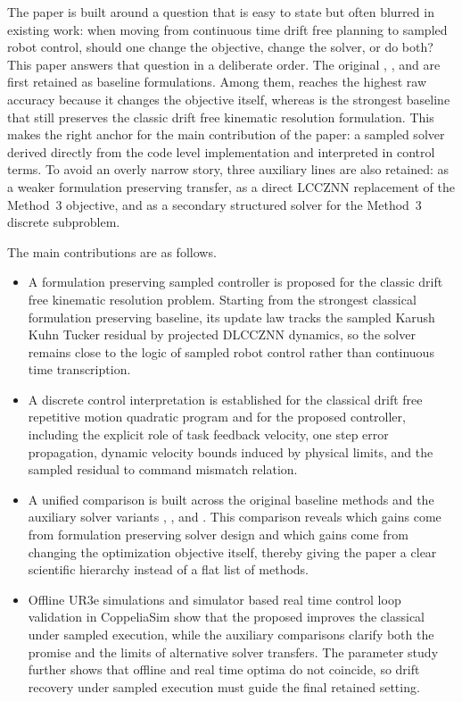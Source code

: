 The paper is built around a question that is easy to state but often blurred in existing work: when moving from continuous time drift free planning to sampled robot control, should one change the objective, change the solver, or do both? This paper answers that question in a deliberate order. The original \methodone{}, \methodtwo{}, and \methodthree{} are first retained as baseline formulations. Among them, \methodthree{} reaches the highest raw accuracy because it changes the objective itself, whereas \methodtwo{} is the strongest baseline that still preserves the classic drift free kinematic resolution formulation. This makes \methodtwo{} the right anchor for the main contribution of the paper: a sampled \methodtwoDL{} solver derived directly from the code level implementation and interpreted in control terms. To avoid an overly narrow story, three auxiliary lines are also retained: \methodoneDL{} as a weaker formulation preserving transfer, \methodthreelcc{} as a direct LCCZNN replacement of the Method~3 objective, and \methodthreepcg{} as a secondary structured solver for the Method~3 discrete subproblem.

The main contributions are as follows.
\begin{itemize}[leftmargin=1.5em]
  \item A formulation preserving sampled \methodtwoDL{} controller is proposed for the classic drift free kinematic resolution problem. Starting from the strongest classical formulation preserving baseline, its update law tracks the sampled Karush Kuhn Tucker residual by projected DLCCZNN dynamics, so the solver remains close to the logic of sampled robot control rather than continuous time transcription.
  \item A discrete control interpretation is established for the classical drift free repetitive motion quadratic program and for the proposed controller, including the explicit role of task feedback velocity, one step error propagation, dynamic velocity bounds induced by physical limits, and the sampled residual to command mismatch relation.
  \item A unified comparison is built across the original baseline methods and the auxiliary solver variants \methodoneDL{}, \methodthreelcc{}, and \methodthreepcg{}. This comparison reveals which gains come from formulation preserving solver design and which gains come from changing the optimization objective itself, thereby giving the paper a clear scientific hierarchy instead of a flat list of methods.
  \item Offline UR3e simulations and simulator based real time control loop validation in CoppeliaSim show that the proposed \methodtwoDL{} improves the classical \methodtwo{} under sampled execution, while the auxiliary comparisons clarify both the promise and the limits of alternative solver transfers. The parameter study further shows that offline and real time optima do not coincide, so drift recovery under sampled execution must guide the final retained setting.
\end{itemize}

